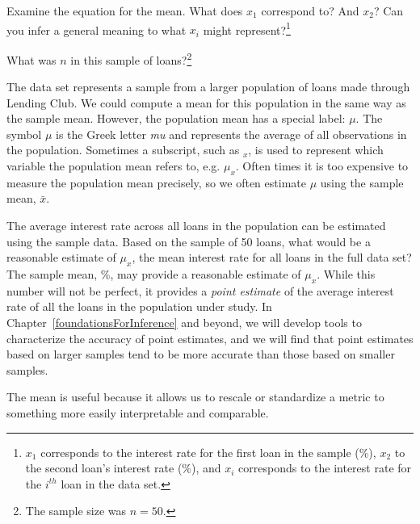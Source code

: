 \begin{exercise}
Examine the equation for the mean.
What does $x_1$ correspond to? And $x_2$?
Can you infer a general meaning to what $x_i$
might represent?\footnote{$x_1$ corresponds to the
  interest rate for the first loan in the sample (\loanA\%),
  $x_2$ to the second loan's interest rate (\loanB\%),
  and $x_i$ corresponds to the interest rate for the
  $i^{th}$ loan in the data set.}
\end{exercise}

\begin{exercise}
What was $n$ in this sample of
loans?\footnote{The sample size was $n = 50$.}
\end{exercise}

The  data set represents a sample from
a larger population of loans made through Lending Club.
We could compute a mean for this population in the same way
as the sample mean.
However, the population mean has a special label: $\mu$.
The symbol $\mu$ is the Greek letter \emph{mu} and represents
the average of all observations in the population.
Sometimes a subscript, such as $_x$,
is used to represent which variable the population mean
refers to, e.g. $\mu_x$.
Often times it is too expensive to measure the
population mean precisely, so we often estimate
$\mu$ using the sample mean, $\bar{x}$.

\begin{example}{The average interest rate across all loans
  in the population can be estimated using the sample data.
  Based on the sample of 50 loans,
  what would be a reasonable estimate of $\mu_x$,
  the mean interest rate for all loans in the
  full data set?}
The sample mean, \loanAvg{}\%, may provide a reasonable estimate
of $\mu_x$.
While this number will not be perfect,
it provides a \emph{point estimate} 
of the average interest rate of all the loans in the
population under study.
In Chapter~\ref{foundationsForInference} and beyond,
we will develop tools to characterize the accuracy
of point estimates, and we will find that point estimates
based on larger samples tend to be more accurate than
those based on smaller samples.
\end{example}


The mean is useful because it allows us to
rescale or standardize a metric to something more easily
interpretable and comparable.

